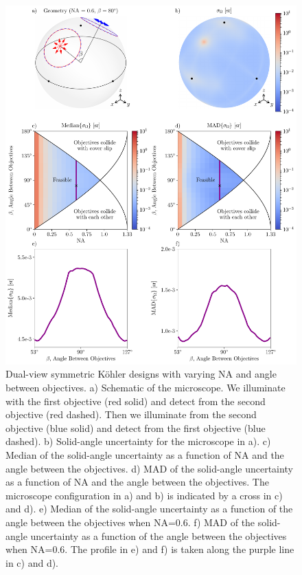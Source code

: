 \documentclass[10pt]{article}
\begin{document}
\begin{figure}[htbp]
\centering\includegraphics[width=\textwidth]{symmetric-widefield}
\caption{Dual-view symmetric K\"ohler designs with varying NA and angle between
  objectives. a) Schematic of the microscope. We illuminate with the first
  objective (red solid) and detect from the second objective (red dashed). Then
  we illuminate from the second objective (blue solid) and detect from the first
  objective (blue dashed). b) Solid-angle uncertainty for the microscope in
  a). c) Median of the solid-angle uncertainty as a function of NA and the angle
  between the objectives. d) MAD of the solid-angle uncertainty as a function of
  NA and the angle between the objectives. The microscope configuration in a)
  and b) is indicated by a cross in c) and d). e) Median of the solid-angle
  uncertainty as a function of the angle between the objectives when NA=0.6. f)
  MAD of the solid-angle uncertainty as a function of the angle between the
  objectives when NA=0.6. The profile in e) and f) is taken along the purple
  line in c) and d).}
\label{fig:symmetric-widefield}
\end{figure}
\end{document}
